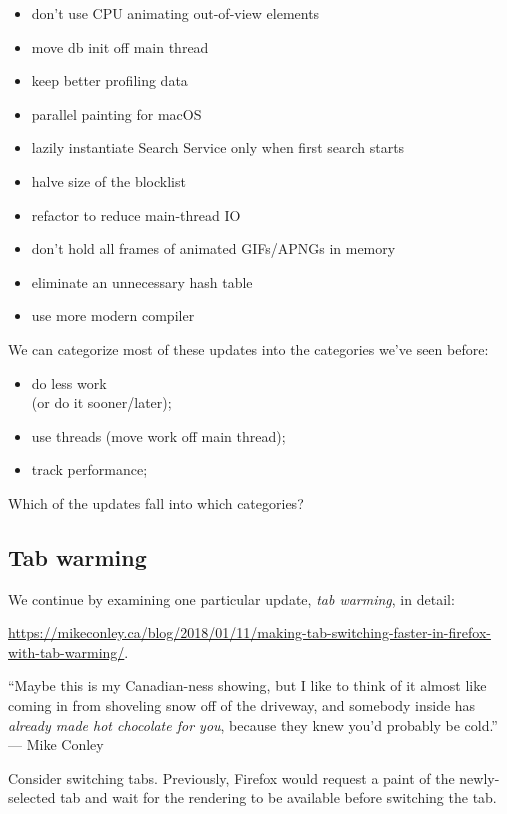\documentclass[a4paper]{report}
\begin{document}
\begin{itemize}[noitemsep]
\item don't use CPU animating out-of-view elements
\item move db init off main thread
\item keep better profiling data
\item parallel painting for macOS
\item lazily instantiate Search Service only when first search starts
\item halve size of the blocklist
\item refactor to reduce main-thread IO
\item don't hold all frames of animated GIFs/APNGs in memory
\item eliminate an unnecessary hash table
\item use more modern compiler
\end{itemize}

We can categorize most of these updates into the categories we've seen before:
\begin{itemize}[noitemsep]
\item do less work\\
 (or do it sooner/later);
\item use threads (move work off main thread);
\item track performance;
\end{itemize}
Which of the updates fall into which categories?

\subsection*{Tab warming} We continue by examining one particular update, \emph{tab warming}, in detail:
\begin{center}
\scriptsize
\vspace*{-1em}
\url{https://mikeconley.ca/blog/2018/01/11/making-tab-switching-faster-in-firefox-with-tab-warming/}.
\end{center}
\vspace*{-1em}

\hfill ``Maybe this is my Canadian-ness showing, but I like to think of it almost like coming in from shoveling snow off of the driveway, and somebody inside has \emph{already made hot chocolate for you}, because they knew you’d probably be cold.'' --- Mike Conley

Consider switching tabs. Previously, Firefox would request a paint of the newly-selected tab and wait for the rendering to be available before switching the tab.
\end{document}
